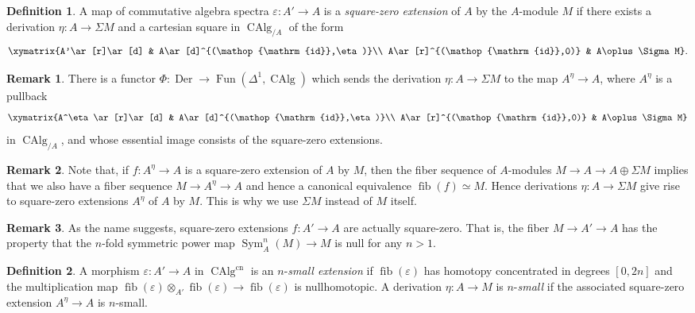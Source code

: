 \documentclass[12pt]{article}
\theoremstyle{definition}
\newtheorem{definition}{Definition}[subsection]
\newtheorem{remark}{Remark}[subsection]
\DeclareMathOperator{\CAlg}{CAlg}
\DeclareMathOperator{\Der}{Der}
\DeclareMathOperator{\Fun}{Fun}
\DeclareMathOperator{\id}{id}
\DeclareMathOperator{\Sym}{Sym}
\DeclareMathOperator{\fib}{fib}
\newcommand{\cn}{\mathrm{cn}}
\renewcommand{\epsilon}{\varepsilon}
\begin{document}
\begin{definition}
A map of  commutative algebra spectra $\epsilon:A'\to A$ is a {\em square-zero extension}
of $A$ by the $A$-module $M$ if there exists a derivation $\eta:A\to\Sigma M$ and a cartesian square in $\CAlg_{/A}$ of the form
\[
\xymatrix{A'\ar[r]\ar[d] & A\ar[d]^{(\id,\eta)}\\
A\ar[r]^{(\id,0)} & A\oplus \Sigma M}.
\]
\end{definition}
\begin{remark}\label{Phi}
There is a functor $\Phi:\Der\to\Fun(\Delta^1,\CAlg)$
\index{$\Phi$}
which sends the derivation $\eta:A\to\Sigma M$ to the map $A^\eta\to A$, where $A^\eta$ is a pullback
\[
\xymatrix{A^\eta\ar[r]\ar[d] & A\ar[d]^{(\id,\eta)}\\
A\ar[r]^{(\id,0)} & A\oplus \Sigma M} 
\]
in $\CAlg_{/A}$,
and whose essential image consists of the square-zero extensions.
\end{remark}



\begin{remark}
Note that, if $f:A^\eta\to A$ is a square-zero extension of $A$ by $M$, then the fiber sequence of $A$-modules $M\to A\to A\oplus\Sigma M$ implies that we also have a fiber sequence $M\to A^\eta\to A$ and hence a canonical equivalence $\fib(f)\simeq M$.
Hence derivations $\eta:A\to\Sigma M$ give rise to square-zero extensions $A^\eta$ of $A$ by $M$.
This is why we use $\Sigma M$ instead of $M$ itself.
\end{remark}



\begin{remark}
As the name suggests, square-zero extensions $f:A'\to A$ are actually square-zero.
That is, the fiber $M\to A'\to A$ has the property that the $n$-fold symmetric power map $\Sym_A^n(M)\to M$ is null for any $n>1$.
\end{remark}

\begin{definition}
A morphism $\epsilon:A'\to A$ in $\CAlg^{\cn}$ is an $n$-{\em small extension}
if $\fib(\epsilon)$ has homotopy concentrated in degrees $[0,2n]$ and the multiplication map $\fib(\epsilon)\otimes_{A'}\fib(\epsilon)\to\fib(\epsilon)$ is nullhomotopic.
A derivation $\eta:A\to M$ is $n$-{\em small} if the associated square-zero extension $A^\eta\to A$ is $n$-small.
\end{definition}
\end{document}
